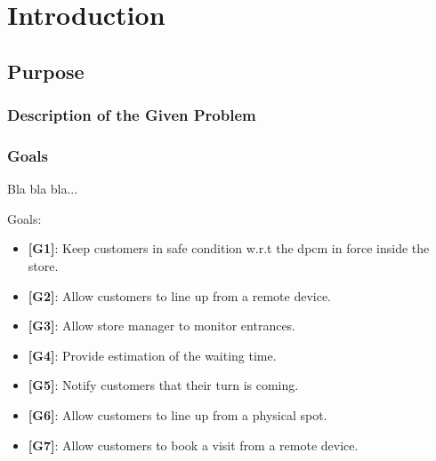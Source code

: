 \chapter{Introduction}

\section{Purpose}

\subsection{Description of the Given Problem}

\subsection{Goals}

Bla bla bla...

Goals:
\begin{itemize}

	\item {\textbf{[G1]}}: Keep customers in safe condition w.r.t the \gls{dpcm} in force inside the store.
	
		
	\item {\textbf{[G2]}}: Allow customers to line up from a remote device.
		
	\item {\textbf{[G3]}}: Allow store manager to monitor entrances.
	
	\item {\textbf{[G4]}}: Provide estimation of the waiting time.
	
	\item {\textbf{[G5]}}: Notify customers that their turn is coming.
	
	\item {\textbf{[G6]}}: Allow customers to line up from a physical spot.

	\item {\textbf{[G7]}}: Allow customers to book a visit from a remote device.

	
\end{itemize}

